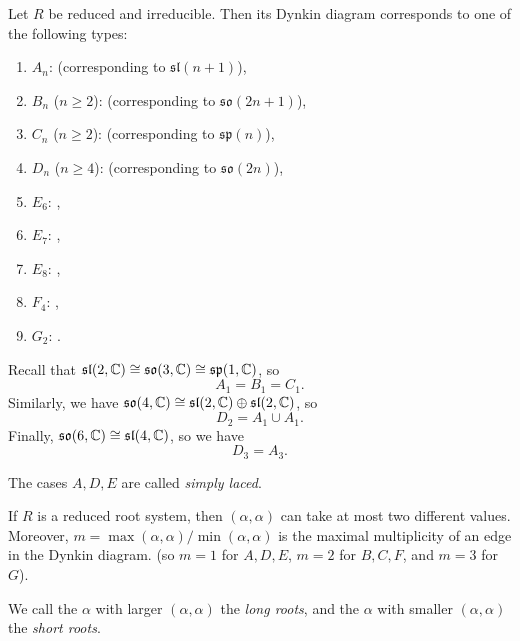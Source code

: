 \begin{theorem}
  Let $R$ be reduced and irreducible.
  Then its Dynkin diagram corresponds
  to one of the following types:
  \begin{enumerate}
    \item $A_n$: 
      (corresponding to $\mathfrak{sl}(n + 1)$),
    \item $B_n$ ($n \ge 2$):
       (corresponding to
      $\mathfrak{so}(2n + 1)$),
    \item $C_n$ ($n \ge 2$):
       (corresponding to
      $\mathfrak{sp}(n)$),
    \item $D_n$ ($n \ge 4$):
       (corresponding to
      $\mathfrak{so}(2n)$),
    \item $E_6$: ,
    \item $E_7$: ,
    \item $E_8$: ,
    \item $F_4$: ,
    \item $G_2$: .
  \end{enumerate}
\end{theorem}

\begin{remark}
  Recall that
  $\mathfrak{sl}(2, \mathbb{C}) \cong \mathfrak{so}(3, \mathbb{C}) \cong \mathfrak{sp}(1, \mathbb{C})$, so
  \[
    A_1 = B_1 = C_1.
  \]
  Similarly, we have
  $\mathfrak{so}(4, \mathbb{C}) \cong \mathfrak{sl}(2, \mathbb{C}) \oplus \mathfrak{sl}(2, \mathbb{C})$,
  so
  \[
    D_2 = A_1 \cup A_1.
  \]
  Finally, $\mathfrak{so}(6, \mathbb{C}) \cong \mathfrak{sl}(4, \mathbb{C})$,
  so we have
  \[
    D_3 = A_3.
  \]
\end{remark}

\begin{remark}
  The cases $A, D, E$ are called
  \emph{simply laced}.
\end{remark}

\begin{corollary}
  If $R$ is a reduced root system,
  then $(\alpha, \alpha)$ can take
  at most two different values.
  Moreover,
  $m = \max(\alpha, \alpha) / {\min(\alpha, \alpha)}$
  is the maximal multiplicity
  of an edge in the Dynkin diagram.
  (so $m = 1$ for $A, D, E$,
  $m = 2$ for $B, C, F$, and
  $m = 3$ for $G$).
\end{corollary}

\begin{remark}
  We call the
  $\alpha$ with larger
  $(\alpha, \alpha)$
  the \emph{long roots}, and
  the $\alpha$ with smaller
  $(\alpha, \alpha)$
  the \emph{short roots}.
\end{remark}

